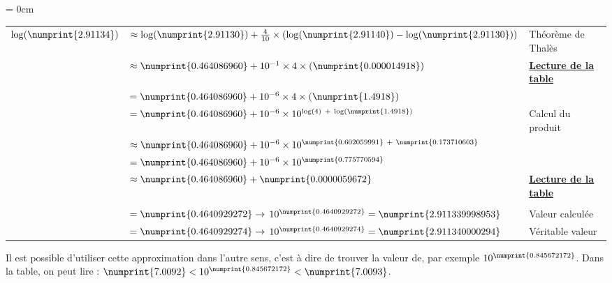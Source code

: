 \documentclass[a4paper]{article}
\begin{document}
{\parindent = 0cm

\begin{small}
\begin{tabular}{cl|l}
$\log (\numprint{2.91134}) $ & $\approx \log ( \numprint{2.91130} ) + \frac{4}{10} \times ( \log ( \numprint{2.91140} ) - \log ( \numprint{2.91130} ) )$ & Théorème de Thalès\\
							 & $\approx \numprint{0.464 086 960} + 10^{-1} \times 4 \times (\numprint{0.000014 918} )$ & \underline{\textbf{Lecture de la table}}\\
							 & $= \numprint{0.464 086 960} + 10^{-6} \times 4 \times ( \numprint{1.4 918} )$ &\\
							 & $= \numprint{0.464 086 960} + 10^{-6} \times 10^{\log(4)~+~\log(\numprint{1.4 918})}$ & Calcul du produit\\
							 & $\approx \numprint{0.464 086 960} + 10^{-6} \times 10^{\numprint{0.602 059 991}~+~\numprint{0.173 710 603}}$ &\\
							 & $= \numprint{0.464 086 960} + 10^{-6} \times 10^{\numprint{0.775770594}}$ & \\
							 & $\approx \numprint{0.464 086 960} + \numprint{0.000 005 967 2}$ & \underline{\textbf{Lecture de la table}}\\
							 & & \\
							 & $= \numprint{0.464 092 927 2} \rightarrow $ $10^{\numprint{0.464 092 927 2}} = \numprint{2.911 339 998 953}$ & Valeur calculée \\
							 & $= \numprint{0.464 092 927 4} \rightarrow $ $10^{\numprint{0.464 092 927 4}} = \numprint{2.911 340 000 294}$  & Véritable valeur\\
\end{tabular}
\end{small}

}

\vspace{2 mm}

Il est possible d'utiliser cette approximation dans l'autre sens, c'est à dire de trouver la valeur de, par exemple $10^{\numprint{0.845 672 172}}$. Dans la table, on peut lire : $\numprint{7.0092} <  10^{\numprint{0.845 672 172}} < \numprint{7.0093}$.

\vspace{2 mm}
\end{document}
